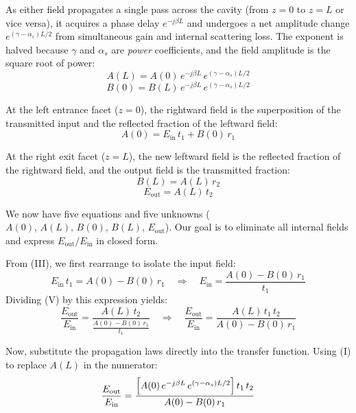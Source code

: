As either field propagates a single pass across the cavity (from $z=0$ to $z=L$ or vice versa), it acquires a phase delay $e^{-j\beta L}$ and undergoes a net amplitude change $e^{(\gamma-\alpha_s)L/2}$ from simultaneous gain and internal scattering loss. The exponent is halved because $\gamma$ and $\alpha_s$ are \emph{power} coefficients, and the field amplitude is the square root of power:
\begin{equation}
    A(L) = A(0)\,e^{-j\beta L}\,e^{(\gamma-\alpha_s)L/2} \tag{I}
\end{equation}
\begin{equation}
    B(0) = B(L)\,e^{-j\beta L}\,e^{(\gamma-\alpha_s)L/2} \tag{II}
\end{equation}

At the left entrance facet ($z = 0$), the rightward field is the superposition of the transmitted input and the reflected fraction of the leftward field:
\begin{equation}
    A(0) = E_{\text{in}}\,t_1 + B(0)\,r_1 \tag{III}
\end{equation}

At the right exit facet ($z = L$), the new leftward field is the reflected fraction of the rightward field, and the output field is the transmitted fraction:
\begin{equation}
    B(L) = A(L)\,r_2 \tag{IV}
\end{equation}
\begin{equation}
    E_{\text{out}} = A(L)\,t_2 \tag{V}
\end{equation}

We now have five equations and five unknowns ($A(0),\,A(L),\,B(0),\,B(L),\,E_{\text{out}}$). Our goal is to eliminate all internal fields and express $E_{\text{out}}/E_{\text{in}}$ in closed form.

From \textup{(III)}, we first rearrange to isolate the input field:
\begin{equation*}
    E_{\text{in}}\,t_1 = A(0) - B(0)\,r_1 \quad \Rightarrow \quad E_{\text{in}} = \frac{A(0) - B(0)\,r_1}{t_1}
\end{equation*}
Dividing \textup{(V)} by this expression yields:
\begin{equation}
    \frac{E_{\text{out}}}{E_{\text{in}}} = \frac{A(L)\,t_2}{\displaystyle \frac{A(0)-B(0)\,r_1}{t_1}} \quad \Rightarrow \quad \frac{E_{\text{out}}}{E_{\text{in}}} = \frac{A(L)\,t_1\,t_2}{A(0)-B(0)\,r_1} \tag{VI}
\end{equation}

Now, substitute the propagation laws directly into the transfer function. Using \textup{(I)} to replace $A(L)$ in the numerator:
\begin{equation*}
    \frac{E_{\text{out}}}{E_{\text{in}}} = \frac{\Bigl[A(0)\,e^{-j\beta L}\,e^{(\gamma-\alpha_s)L/2}\Bigr]\,t_1\,t_2}{A(0)-B(0)\,r_1}
\end{equation*}


